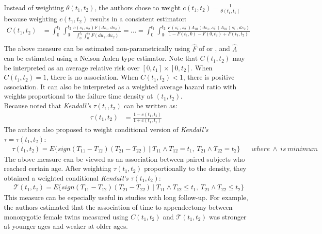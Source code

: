 \documentclass[]{article}
\begin{document}
Instead of weighting $\theta(t_1, t_2)$, the authors chose to weight $c(t_1, t_2) = \frac{1}{\theta(t_1, t_2)}$ because weighting $c(t_1, t_2)$ results in a consistent estimator:
	$$
	\begin{aligned}
		C(t_1, t_2) &= \int_0^{t_1}\int_0^{t_2} \frac{c(s_1, s_2)F(ds_1,ds_2)}{\int_0^{t_1}\int_0^{t_2} F(du_1, du_2)} = ...= \int_0^{t_1}\int_0^{t_2} \frac{F(s_1^-, s_2^-)\Lambda_{10}(ds_1, s^-_2)\Lambda_{01}(s^-_1, ds_2)}{1 - F(t_1, 0) - F(0, t_2)+ F(t_1, t_2)} \\
	\end{aligned}
	$$
	The above measure can be estimated non-parametrically using $\hat{F}$ of \cite{dabrowska1988kaplan} or \cite{prentice1992covariance}, and $\hat{\Lambda}$ can be estimated using a Nelson-Aalen type estimator.
Note that $C(t_1, t_2)$ may be interpreted as an average relative risk over $[0,t_1] \times [0, t_2]$. When $C(t_1, t_2)=1$, there is no association. When $C(t_1, t_2)<1$, there is positive association. It can also be interpreted as a weighted average hazard ratio with weights proportional to the failure time density at $(t_1,t_2)$.\\
Because \cite{oakes1989bivariate} noted that \emph{Kendall's} $\tau(t_1, t_2)$ can be written as:
	$$
	\begin{aligned}
		\tau(t_1, t_2) &= \frac{1 - c(t_1, t_2)}{1+c(t_1, t_2)}
	\end{aligned}
	$$
	The authors also proposed to weight conditional version of \emph{Kendall's} $\tau=\tau(t_1, t_2)$:
	$$
	\begin{aligned}
		&\tau(t_1, t_2) = E\{sign(T_{11} - T_{12}) (T_{21} - T_{22})~|~ T_{11}\wedge T_{12} = t_1,~T_{21}\wedge T_{22} = t_2  \}
		&~~~~where~\wedge~is~minimum
	\end{aligned}
	$$
The above measure can be viewed as an association between paired subjects who reached certain age. After weighting $\tau(t_1, t_2)$ proportionally to the density, they obtained a weighted conditional \emph{Kendall's} $\tau(t_1, t_2)$:
	$$
	\begin{aligned}
		&\mathcal{T}(t_1, t_2) = E\{sign(T_{11} - T_{12}) (T_{21} - T_{22})~|~ T_{11}\wedge T_{12} \leq t_1,~T_{21}\wedge T_{22} \leq t_2  \}
	\end{aligned}
	$$
This measure can be especially useful in studies with long follow-up. For example, the authors estimated that the association of time to appendectomy between monozygotic female twins measured using $C(t_1, t_2)$ and $\mathcal{T}(t_1, t_2)$ was stronger at younger ages and weaker at older ages.\\
\end{document}
